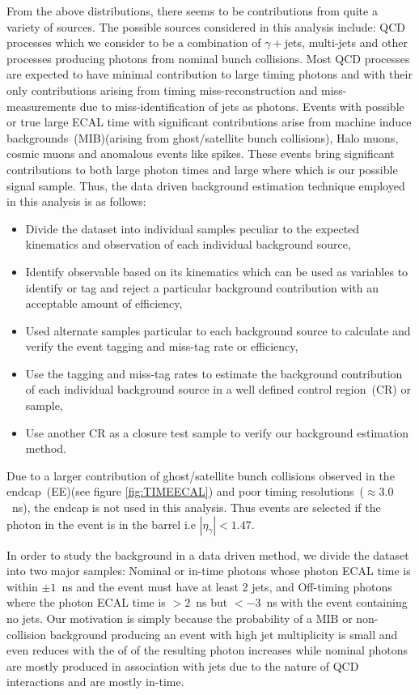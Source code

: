 From the above distributions, there seems to be contributions from quite a variety of sources. The possible sources considered in this analysis include: QCD processes  which we consider to be a combination of $\gamma + $jets, multi-jets and other processes producing photons from nominal bunch collisions. Most QCD processes are expected to have minimal contribution to large timing photons and \MET with their only contributions arising from timing miss-reconstruction and \MET miss-measurements due to miss-identification of jets as photons. Events with possible or true large ECAL time with significant contributions arise from machine induce backgrounds~(MIB)(arising from ghost/satellite bunch collisions), Halo muons, cosmic muons and anomalous events like spikes. These events bring significant contributions to both large photon times and large \MET where which is our possible signal sample.
Thus, the data driven background estimation technique employed in this analysis is as follows:

\begin{itemize}
\item Divide the dataset into individual samples peculiar to the expected kinematics and observation of each individual background source,
\item Identify observable based on its kinematics which can be used as variables to identify or tag and reject a particular background contribution with an acceptable amount of efficiency,
\item Used alternate samples particular to each background source to calculate and verify the event tagging and miss-tag rate or efficiency,
\item Use the tagging and miss-tag rates to estimate the background contribution of each individual background source in a well defined control region~(CR) or sample,
\item Use another CR as a closure test sample to verify our background estimation method.
\end{itemize}

Due to a larger contribution of ghost/satellite bunch collisions observed in the endcap~(EE)(see figure \ref{fig:TIMEECAL}) and poor timing resolutions~($\approx 3.0$~ns), the endcap is not used in this analysis. Thus events are selected if the photon in the event is in the barrel i.e $|\eta_{\gamma}| < 1.47$.

In order to study the background in a data driven method, we divide the dataset into two major samples: Nominal or in-time photons whose photon ECAL time is within $\pm 1$~ns and the event must have at least 2 jets,  and Off-timing photons where the photon ECAL time is $ > 2$~ns but $ < -3$~ns with the event containing no jets. Our motivation is simply because the probability of a MIB or non-collision background producing an event with high jet multiplicity is small  and even reduces with the \pt of of the resulting photon increases while nominal photons are mostly produced in association with jets due to the nature of QCD interactions and are mostly in-time.

